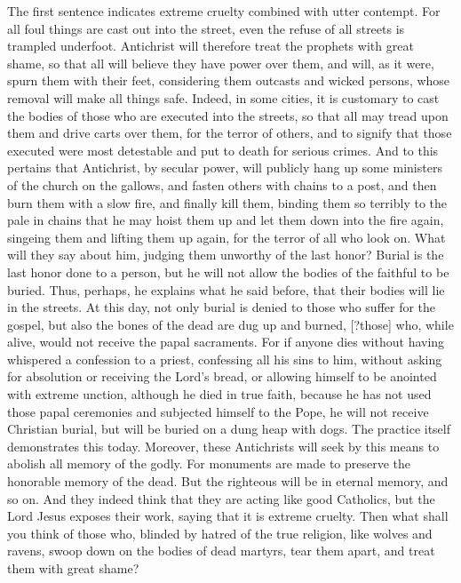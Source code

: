 The first sentence indicates extreme cruelty combined with utter contempt. For all foul things are cast out into the street, even the refuse of all streets is trampled underfoot. Antichrist will therefore treat the prophets with great shame, so that all will believe they have power over them, and will, as it were, spurn them with their feet, considering them outcasts and wicked persons, whose removal will make all things safe. Indeed, in some cities, it is customary to cast the bodies of those who are executed into the streets, so that all may tread upon them and drive carts over them, for the terror of others, and to signify that those executed were most detestable and put to death for serious crimes. And to this pertains that Antichrist, by secular power, will publicly hang up some ministers of the church on the gallows, and fasten others with chains to a post, and then burn them with a slow fire, and finally kill them, binding them so terribly to the pale in chains that he may hoist them up and let them down into the fire again, singeing them and lifting them up again, for the terror of all who look on. What will they say about him, judging them unworthy of the last honor? Burial is the last honor done to a person, but he will not allow the bodies of the faithful to be buried. Thus, perhaps, he explains what he said before, that their bodies will lie in the streets. At this day, not only burial is denied to those who suffer for the gospel, but also the bones of the dead are dug up and burned, [?those] who, while alive, would not receive the papal sacraments. For if anyone dies without having whispered a confession to a priest, confessing all his sins to him, without asking for absolution or receiving the Lord’s bread, or allowing himself to be anointed with extreme unction, although he died in true faith, because he has not used those papal ceremonies and subjected himself to the Pope, he will not receive Christian burial, but will be buried on a dung heap with dogs. The practice itself demonstrates this today. Moreover, these Antichrists will seek by this means to abolish all memory of the godly. For monuments are made to preserve the honorable memory of the dead. But the righteous will be in eternal memory, and so on. And they indeed think that they are acting like good Catholics, but the Lord Jesus exposes their work, saying that it is extreme cruelty. Then what shall you think of those who, blinded by hatred of the true religion, like wolves and ravens, swoop down on the bodies of dead martyrs, tear them apart, and treat them with great shame?

